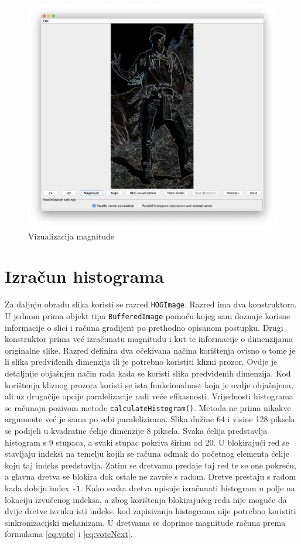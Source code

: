 \documentclass[times, utf8, zavrsni]{fer}
\begin{document}
\begin{figure}[htb]
	\centering
	\includegraphics[width=0.75\linewidth]{figures/magnitude.png}
	\caption{Vizualizacija magnitude}
	\label{fig:magnitude}
\end{figure}

\section{Izračun histograma}
Za daljnju obradu slika koristi se razred \verb|HOGImage|. Razred ima dva konstruktora. U jednom prima objekt tipa \verb|BufferedImage| pomoću kojeg sam doznaje korisne informacije o slici i računa gradijent po prethodno opisanom postupku. Drugi konstruktor prima već izračunatu magnitudu i kut te informacije o dimenzijama originalne slike. Razred definira dva očekivana načina korištenja ovisno o tome je li slika predviđenih dimenzija ili je potrebno koristiti klizni prozor. Ovdje je detaljnije objašnjen način rada kada se koristi slika predviđenih dimenzija. Kod korištenja kliznog prozora koristi se ista funkcionalnost koja je ovdje objašnjena, ali uz drugačije opcije paralelizacije radi veće efikasnosti. Vrijednosti histograma se računaju pozivom metode \verb|calculateHistogram()|. Metoda ne prima nikakve argumente već je sama po sebi paralelizirana. Slika dužine 64 i visine 128 piksela se podijeli u kvadratne ćelije dimenzije 8 piksela. Svaka ćelija predstavlja histogram s 9 stupaca, a svaki stupac pokriva širinu od 20\degree. U blokirajući red se stavljaju indeksi na temelju kojih se računa odmak do početnog elementa ćelije koju taj indeks predstavlja. Zatim se dretvama predaje taj red te se one pokreću, a glavna dretva se blokira dok ostale ne završe s radom. Dretve prestaju s radom kada dobiju index \verb|-1|. Kako svaka dretva upisuje izračunati histogram u polje na lokaciju izvučenog indeksa, a zbog korištenja blokirajućeg reda nije moguće da dvije dretve izvuku isti indeks, kod zapisivanja histograma nije potrebno koristiti sinkronizacijski mehanizam. U dretvama se doprinos magnitude računa prema formulama \ref{eq:vote} i \ref{eq:voteNext}.
\end{document}
